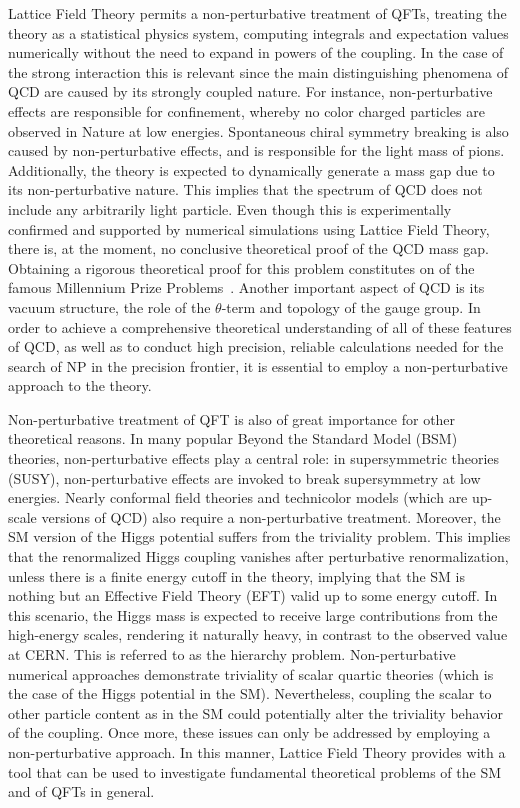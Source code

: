 Lattice Field Theory permits a non-perturbative treatment of QFTs, treating the theory as a statistical physics system, computing integrals and expectation values numerically without the need to expand in powers of the coupling. In the case of the strong interaction this is relevant since the main distinguishing phenomena of QCD are caused by its strongly coupled nature. For instance, non-perturbative effects are responsible for confinement, whereby no color charged particles are observed in Nature at low energies. Spontaneous chiral symmetry breaking is also caused by non-perturbative effects, and is responsible for the light mass of pions. Additionally, the theory is expected to dynamically generate a mass gap due to its non-perturbative nature. This implies that the spectrum of QCD does not include any arbitrarily light particle. Even though this is experimentally confirmed and supported by numerical simulations using Lattice Field Theory, there is, at the moment, no conclusive theoretical proof of the QCD mass gap. Obtaining a rigorous theoretical proof for this problem constitutes on of the famous Millennium Prize Problems~\citep{MillenniumPrizeproblems}. Another important aspect of QCD is its vacuum structure, the role of the $\theta$-term and topology of the gauge group. In order to achieve a comprehensive theoretical understanding of all of these features of QCD, as well as to conduct high precision, reliable calculations needed for the search of NP in the precision frontier, it is essential to employ a non-perturbative approach to the theory.

Non-perturbative treatment of QFT is also of great importance for other theoretical reasons. In many popular Beyond the Standard Model (BSM) theories, non-perturbative effects play a central role: in supersymmetric theories (SUSY), non-perturbative effects are invoked to break supersymmetry at low energies. Nearly conformal field theories and technicolor models (which are up-scale versions of QCD) also require a non-perturbative treatment.  Moreover, the SM version of the Higgs potential suffers from the triviality problem. This implies that the renormalized Higgs coupling vanishes after perturbative renormalization, unless there is a finite energy cutoff in the theory, implying that the SM is nothing but an Effective Field Theory (EFT) valid up to some energy cutoff. In this scenario, the Higgs mass is expected to receive large contributions from the high-energy scales, rendering it naturally heavy, in contrast to the observed value at CERN. This is referred to as the hierarchy problem. Non-perturbative numerical approaches demonstrate triviality of scalar quartic theories (which is the case of the Higgs potential in the SM). Nevertheless, coupling the scalar to other particle content as in the SM could potentially alter the triviality behavior of the coupling. Once more, these issues can only be addressed by employing a non-perturbative approach. In this manner, Lattice Field Theory provides with a tool that can be used to investigate fundamental theoretical problems of the SM and of QFTs in general.

